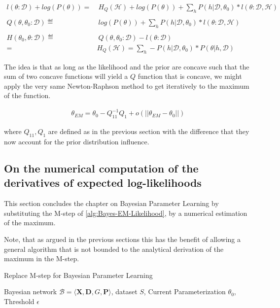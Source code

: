 \documentclass[11pt]{article}
\begin{document}
\begin{article}
\begin{align} \label{eq:likelihood_energy_map_iterative}
l (\theta: \mathscr{D}) + log(P(\theta)) =& \ H_Q (\mathscr {H}) + log(P(\theta)) + \sum_h P(h | \mathscr{D}, \theta_0) * l (\theta: \mathscr{D}, \mathscr{H})\\
\nonumber\\
Q(\theta, \theta_0 : \mathscr{D}) \eqdef& \ log(P(\theta)) + \sum_h P(h | \mathscr{D}, \theta_0) * l (\theta: \mathscr{D}, \mathscr{H})\\
\nonumber\\  
H(\theta_0, \theta: \mathscr{D}) \eqdef& \ Q(\theta, \theta_0 : \mathscr{D}) - l (\theta: \mathscr{D}) \\
                                 =& H_Q (\mathscr {H}) = \sum_h - P(h | \mathscr{D}, \theta_0) * P(\theta | h, \mathscr{D}) \nonumber
\end{align}

The idea is that as long as the likelihood and the prior are
concave such that the sum of two concave functions will yield a \(Q\)
function that is concave, we might apply the very same
Newton-Raphson method to get iteratively to the maximum of the
function.

\begin{align} 
 \theta_{EM}  = \theta_{0} - Q_{11}^{-1} Q_1 + o(||\theta_{EM} - \theta_{0}||) \label{eq:em-iterative}
\end{align}

where \(Q_{11}, Q_1\) are defined as in the previous section with the
difference that they now account for the prior distribution
influence.

\subsection{On the numerical computation of the derivatives of expected log-likelihoods}
\label{sec:orgd0085fa}

This section concludes the chapter on Bayesian Parameter Learning
by substituting the M-step of \ref{alg:Bayes-EM-Likelihood}, by a
numerical estimation of the maximum.

Note, that as argued in the previous sections this has the benefit
of allowing a general algorithm that is not bounded to the
analytical derivation of the maximum in the M-step.

\begin{algorithm*}[h!]
\caption{Replace M-step for Bayesian Parameter Learning}
\label{alg:Numerical-M-Step}
\vspace{-10pt}
\begin{multicols}{2}
\begin{algorithmic}[1] 
\Require Bayesian network $\mathcal{B}=\langle \mathbf{X},\mathbf{D}, G, \mathbf{P} \rangle$, dataset $S$, Current Parameterization $\theta_0$, Threshold $\epsilon$


\end{algorithmic}
\end{multicols}
\end{algorithm*}
\end{article}
\end{document}
